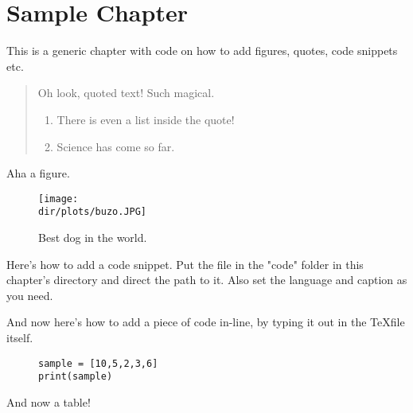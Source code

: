\chapter{Sample Chapter}
\label{ch:sample_chapter}

This is a generic chapter with code on how to add figures, quotes, code snippets etc.

\begin{quote}
Oh look, quoted text! Such magical.
\begin{enumerate}
\item There is even a list inside the quote!
\item Science has come so far.
\end{enumerate}
\end{quote}

Aha a figure.

\begin{figure}[H]
\centering
\captionsetup{justification=centering}
\texttt{[image: \\dir/plots/buzo.JPG]}
\caption{Best dog in the world.}
\label{fig:buzo}
\end{figure}

Here's how to add a code snippet. Put the file in the "code" folder in this chapter's directory and direct the path to it. Also set the language and caption as you need.

\begin{figure}[H]

\label{listing:sample_listing}
\end{figure}

And now here's how to add a piece of code in-line, by typing it out in the \TeX file itself.
\begin{figure}[H]
\begin{lstlisting}
sample = [10,5,2,3,6]
print(sample)
\end{lstlisting}
\end{figure}

And now a table!

